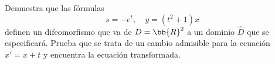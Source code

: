 \documentclass[12pt]{article}
\begin{document}
\begin{ejercicio}
    Demuestra que las fórmulas
    \begin{equation*}
        s = -e^t, \quad y = (t^2 + 1)x
    \end{equation*}
    definen un difeomorfismo que va de $D = \bb{R}^2$ a un dominio $\hat{D}$ que se especificará.
    Prueba que se trata de un cambio admisible para la ecuación $x' = x + t$ y encuentra la ecuación transformada.
\end{ejercicio}

    
\end{document}
